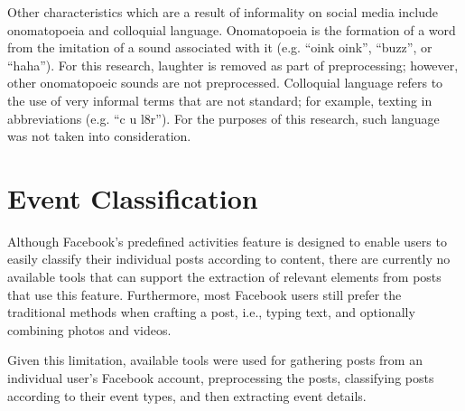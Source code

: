 Other characteristics which are a result of informality on social media include onomatopoeia and colloquial language. Onomatopoeia is the formation of a word from the imitation of a sound associated with it (e.g. ``oink oink”, ``buzz”, or ``haha”). For this research, laughter is removed as part of preprocessing; however, other onomatopoeic sounds are not preprocessed. Colloquial language refers to the use of very informal terms that are not standard; for example, texting in abbreviations (e.g. ``c u l8r”). For the purposes of this research, such language was not taken into consideration.


\section{Event Classification}
Although Facebook’s predefined activities feature is designed to enable users to easily classify their individual posts according to content, there are currently no available tools that can support the extraction of relevant elements from posts that use this feature. Furthermore, most Facebook users still prefer the traditional methods when crafting a post, i.e., typing text, and optionally combining photos and videos.

Given this limitation, available tools were used for gathering posts from an individual user's Facebook account, preprocessing the posts, classifying posts according to their event types, and then extracting event details.

